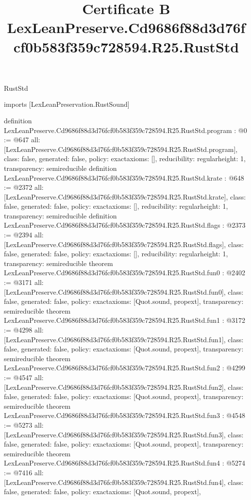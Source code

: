 \begin{lexlean}{RustStd}
\title{Certificate B LexLeanPreserve.Cd9686f88d3d76fcf0b583f359c728594.R25.RustStd}
\begin{coremodule}
imports [LexLeanPreservation.RustSound]

definition LexLeanPreserve.Cd9686f88d3d76fcf0b583f359c728594.R25.RustStd.program : @0 := @647 {
  all: [LexLeanPreserve.Cd9686f88d3d76fcf0b583f359c728594.R25.RustStd.program],
  class: false,
  generated: false,
  policy: exact{axioms: []},
  reducibility: regular{height: 1},
  transparency: semireducible
}
definition LexLeanPreserve.Cd9686f88d3d76fcf0b583f359c728594.R25.RustStd.krate : @648 := @2372 {
  all: [LexLeanPreserve.Cd9686f88d3d76fcf0b583f359c728594.R25.RustStd.krate],
  class: false,
  generated: false,
  policy: exact{axioms: []},
  reducibility: regular{height: 1},
  transparency: semireducible
}
definition LexLeanPreserve.Cd9686f88d3d76fcf0b583f359c728594.R25.RustStd.flags : @2373 := @2394 {
  all: [LexLeanPreserve.Cd9686f88d3d76fcf0b583f359c728594.R25.RustStd.flags],
  class: false,
  generated: false,
  policy: exact{axioms: []},
  reducibility: regular{height: 1},
  transparency: semireducible
}
theorem LexLeanPreserve.Cd9686f88d3d76fcf0b583f359c728594.R25.RustStd.fun0 : @2402 := @3171 {
  all: [LexLeanPreserve.Cd9686f88d3d76fcf0b583f359c728594.R25.RustStd.fun0],
  class: false,
  generated: false,
  policy: exact{axioms: [Quot.sound, propext]},
  transparency: semireducible
}
theorem LexLeanPreserve.Cd9686f88d3d76fcf0b583f359c728594.R25.RustStd.fun1 : @3172 := @4298 {
  all: [LexLeanPreserve.Cd9686f88d3d76fcf0b583f359c728594.R25.RustStd.fun1],
  class: false,
  generated: false,
  policy: exact{axioms: [Quot.sound, propext]},
  transparency: semireducible
}
theorem LexLeanPreserve.Cd9686f88d3d76fcf0b583f359c728594.R25.RustStd.fun2 : @4299 := @4547 {
  all: [LexLeanPreserve.Cd9686f88d3d76fcf0b583f359c728594.R25.RustStd.fun2],
  class: false,
  generated: false,
  policy: exact{axioms: [Quot.sound, propext]},
  transparency: semireducible
}
theorem LexLeanPreserve.Cd9686f88d3d76fcf0b583f359c728594.R25.RustStd.fun3 : @4548 := @5273 {
  all: [LexLeanPreserve.Cd9686f88d3d76fcf0b583f359c728594.R25.RustStd.fun3],
  class: false,
  generated: false,
  policy: exact{axioms: [Quot.sound, propext]},
  transparency: semireducible
}
theorem LexLeanPreserve.Cd9686f88d3d76fcf0b583f359c728594.R25.RustStd.fun4 : @5274 := @7416 {
  all: [LexLeanPreserve.Cd9686f88d3d76fcf0b583f359c728594.R25.RustStd.fun4],
  class: false,
  generated: false,
  policy: exact{axioms: [Quot.sound, propext]},
}
\end{coremodule}
\end{lexlean}
